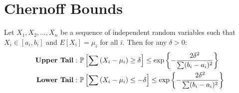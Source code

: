 \appendix
\section{Chernoff Bounds}

\begin{lemma}
\label{Lem:Chernoff}
Let $X_1, X_2,\ldots, X_n$ be a sequence of independent random variables such that $X_i \in[a_i, b_i]$ and $E[X_i]=\mu_i$ for all $i$. Then for any $\delta>0$:
\begin{align*}
\text{\textbf{Upper Tail}}: ~&\mathbb{P}\left[\sum \left(X_i-\mu_i\right)\geq \delta\right]\leq \exp\left\lbrace-\frac{2\delta^2}{\sum(b_i-a_i)^2}\right\rbrace\\
\textbf{Lower Tail}: ~&\mathbb{P}\left[\sum \left(X_i-\mu_i\right)\leq -\delta\right]\leq \exp\left\lbrace-\frac{2\delta^2}{\sum(b_i-a_i)^2}\right\rbrace
\end{align*}
\end{lemma}

